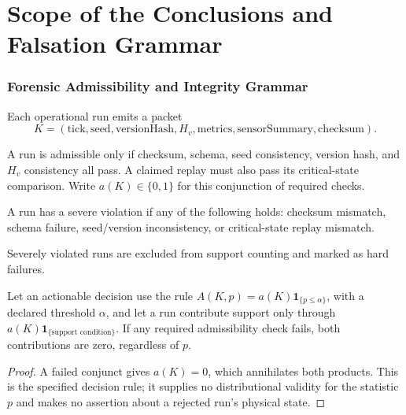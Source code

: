 \part{Scope of the Conclusions and Falsation Grammar}

\section{Forensic Admissibility and Integrity Grammar}

\begin{definition}\label{def:forensic-packet}
Each operational run emits a packet
\[
K=(\mathrm{tick},\mathrm{seed},\mathrm{versionHash},H_v,\mathrm{metrics},\mathrm{sensorSummary},\mathrm{checksum}).
\]
\end{definition}

\begin{assumption}\label{ass:packet-admissibility}
A run is admissible only if checksum, schema, seed consistency, version hash,
and $H_v$ consistency all pass. A claimed replay must also pass its critical-state
comparison. Write $a(K)\in\{0,1\}$ for this conjunction of required checks.
\end{assumption}

\begin{definition}\label{def:severe-violation}
A run has a severe violation if any of the following holds: checksum mismatch,
schema failure, seed/version inconsistency, or critical-state replay mismatch.
\end{definition}

\begin{criterion}\label{crit:integrity-gate}
Severely violated runs are excluded from support counting and marked as hard failures.
\end{criterion}

\begin{proposition}\label{prop:integrity-first}
Let an actionable decision use the rule
$A(K,p)=a(K)\mathbf1_{\{p\leq\alpha\}}$, with a declared threshold $\alpha$,
and let a run contribute support only through
$a(K)\mathbf1_{\{\text{support condition}\}}$. If any required admissibility
check fails, both contributions are zero, regardless of $p$.
\end{proposition}
\begin{proof}
A failed conjunct gives $a(K)=0$, which annihilates both products.
This is the specified decision rule; it supplies no distributional validity
for the statistic $p$ and makes no assertion about a rejected run's physical state.
\end{proof}


